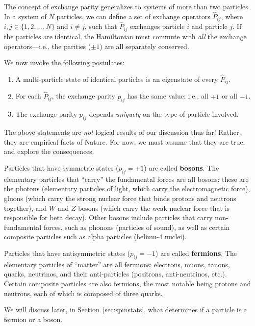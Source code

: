 \documentclass[pra,12pt]{revtex4}
\begin{document}
The concept of exchange parity generalizes to systems of more than two
particles.  In a system of $N$ particles, we can define a set of
exchange operators $\hat{P}_{ij}$, where $i,j\in\{1,2,\dots,N\}$ and
$i\ne j$, such that $\hat{P}_{ij}$ exchanges particle $i$ and particle
$j$.  If the particles are identical, the Hamiltonian must commute
with \textit{all} the exchange operators---i.e., the parities ($\pm
1$) are all separately conserved.

We now invoke the following postulates:
\begin{enumerate}
\item A multi-particle state of identical particles is an eigenstate
  of every $\hat{P}_{ij}$.

\item For each $\hat{P}_{ij}$, the exchange parity $p_{ij}$ has the
  same value: i.e., all $+1$ or all $-1$.

\item The exchange parity $p_{ij}$ depends \textit{uniquely} on the
  type of particle involved.
\end{enumerate}
The above statements are \textit{not} logical results of our
discussion thus far!  Rather, they are empirical facts of Nature.  For
now, we must assume that they are true, and explore the consequences.

Particles that have symmetric states ($p_{ij} = +1$) are called
\textbf{bosons}.  The elementary particles that ``carry'' the
fundamental forces are all bosons: these are the photons (elementary
particles of light, which carry the electromagnetic force), gluons
(which carry the strong nuclear force that binds protons and neutrons
together), and $W$ and $Z$ bosons (which carry the weak nuclear force
that is responsible for beta decay).  Other bosons include particles
that carry non-fundamental forces, such as phonons (particles of
sound), as well as certain composite particles such as alpha particles
(helium-4 nuclei).

Particles that have antisymmetric states ($p_{ij} = -1$) are called
\textbf{fermions}.  The elementary particles of ``matter'' are all
fermions: electrons, muons, tauons, quarks, neutrinos, and their
anti-particles (positrons, anti-neutrinos, etc.).  Certain composite
particles are also fermions, the most notable being protons and
neutrons, each of which is composed of three quarks.

We will discuss later, in Section~\ref{sec:spinstats}, what determines
if a particle is a fermion or a boson.
\end{document}
